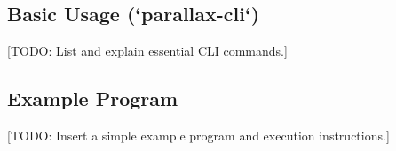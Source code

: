\subsection{Basic Usage (`parallax-cli`)} %
[TODO: List and explain essential CLI commands.]

\subsection{Example Program} %
[TODO: Insert a simple example program and execution instructions.]